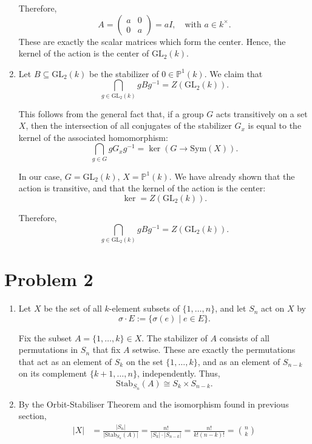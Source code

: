 \documentclass[12pt]{article}
\begin{document}
\begin{enumerate}[label=(\arabic*)]
Therefore,
\[
A = \begin{pmatrix} a & 0 \\ 0 & a \end{pmatrix} = aI, \quad \text{with } a \in k^\times.
\]
These are exactly the scalar matrices which form the center. Hence, the kernel of the action is the center of \( \mathrm{GL}_2(k) \).

\item

Let \( B \subseteq \mathrm{GL}_2(k) \) be the stabilizer of \( 0 \in \mathbb{P}^1(k) \). We claim that
\[
\bigcap_{g \in \mathrm{GL}_2(k)} gBg^{-1} = Z(\mathrm{GL}_2(k)).
\]

This follows from the general fact that, if a group \( G \) acts transitively on a set \( X \), then the intersection of all conjugates of the stabilizer \( G_x \) is equal to the kernel of the associated homomorphism:
\[
\bigcap_{g \in G} gG_xg^{-1} = \ker(G \to \mathrm{Sym}(X)).
\]

In our case, \( G = \mathrm{GL}_2(k) \), \( X = \mathbb{P}^1(k) \). We have already shown that the action is transitive, and that the kernel of the action is the center:
\[
\ker = Z(\mathrm{GL}_2(k)).
\]

Therefore,
\[
\bigcap_{g \in \mathrm{GL}_2(k)} gBg^{-1} = Z(\mathrm{GL}_2(k)).
\]

\end{enumerate}

\section*{Problem 2}
\begin{enumerate}[label=(\arabic*)] 

\item Let \( X \) be the set of all \( k \)-element subsets of \( \{1, \dots, n\} \), and let \( S_n \) act on \( X \) by
\[
\sigma \cdot E := \{ \sigma(e) \mid e \in E \}.
\]

Fix the subset \( A = \{1, \dots, k\} \in X \). The stabilizer of \( A \) consists of all permutations in \( S_n \) that fix \( A \) setwise. 
These are exactly the permutations that act as an element of \( S_k \) on the set \( \{1, \dots, k\} \), and as an element of \( S_{n-k} \) on its complement \( \{k+1, \dots, n\} \), independently. Thus,
\[
\mathrm{Stab}_{S_n}(A) \cong S_k \times S_{n-k}.
\]

\item By the Orbit-Stabiliser Theorem and the isomorphism found in previous section,
\begin{align*}
|X| &= \frac{|S_n|}{\bigl|\mathrm{Stab}_{S_n}(A)\bigr|} = \frac{n!}{|S_k| \cdot|S_{n-k}| } = \frac{n!}{k!(n - k)!} = \binom{n}{k}
\end{align*}
\end{enumerate}
\end{document}
